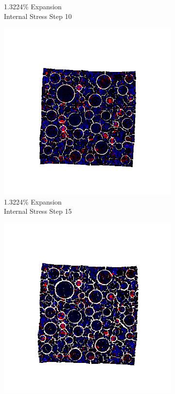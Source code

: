 \begin{figure}[ht!]
\begin{subfigure}{.25\textwidth}
      \caption{1.3224\% Expansion\\Internal Stress Step 10}
    \end{subfigure}%
    \begin{subfigure}{.25\textwidth}
      \centering
      \includegraphics[width=1.0\linewidth]{Files/exp_3D/ASR/A30P75_5_s15.png}
      \caption{1.3224\% Expansion\\Internal Stress Step 15}
    \end{subfigure}%
    \begin{subfigure}{.25\textwidth}
      \centering
      \includegraphics[width=1.0\linewidth]{Files/exp_3D/ASR/A30P75_5_stress.png}

\end{subfigure}
\end{figure}

